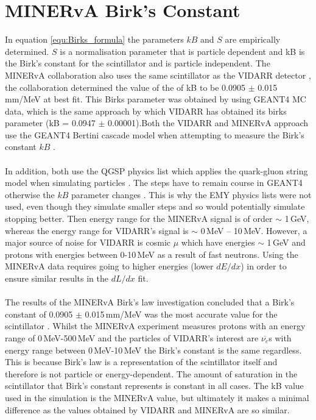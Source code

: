 \section{MINERvA Birk's Constant}\label{sec:GEANT4Simulation_MINERvABirksConstant}
In equation \ref{equ:Birks_formula} the parameters $kB$ and $S$ are empirically determined. $S$ is a normalisation parameter that is particle dependent and kB is the Birk's constant for the scintillator and is particle independent. The MINERvA collaboration \cite{aliaga_2015} also uses the same scintillator as the VIDARR detector \cite{aliaga_2014}, the collaboration determined the value of the of kB to be 0.0905 $\pm$ 0.015\,mm/MeV at best fit. This Birks parameter was obtained by using GEANT4 MC data, which is the same approach by which VIDARR has obtained its birks parameter (kB = 0.0947 $\pm$ 0.00001).Both the VIDARR and MINERvA approach use the GEANT4 Bertini cascade model when attempting to measure the Birk's constant $kB$ \cite{Heikkinen_2003}. 
\\\\In addition, both use the QGSP physics list which applies the quark-gluon string model when simulating particles \cite{Patrick_2018}. The steps have to remain course in GEANT4 otherwise the $kB$ parameter changes  \cite{aliaga_2015}. This is why the EMY physics lists were not used, even though they simulate smaller steps and so would potentially simulate stopping better. Then energy range for the MINERvA signal is of order $\sim$ 1\,GeV, whereas the energy range for VIDARR's signal is $\sim$ 0\,MeV -- 10\,MeV. However, a major source of noise for VIDARR is cosmic $\mu$ which have energies $\sim$ 1\,GeV and protons with energies between 0-10\,MeV as a result of fast neutrons. Using the MINERvA data requires going to higher energies (lower $dE/dx$) in order to ensure similar results in the $dL/dx$ fit.  
\\\\The results of the MINERvA Birk's law investigation concluded that a Birk's constant of 0.0905 $\pm$ 0.015\,mm/MeV was the most accurate value for the scintillator \cite{aliaga_2015}. Whilst the MINERvA experiment measures protons with an energy range of 0\,MeV-500\,MeV and the particles of VIDARR's interest are $\overline{\nu_{e}}$s with energy range between 0\,MeV-10\,MeV the Birk's constant is the same regardless. This is because Birk's law is a representation of the scintillator itself and therefore is not particle or energy-dependent. The amount of saturation in the scintillator that Birk's constant represents is constant in all cases. The kB value used in the simulation is the MINERvA value, but ultimately it makes a minimal difference as the values obtained by VIDARR and MINERvA are so similar. 
